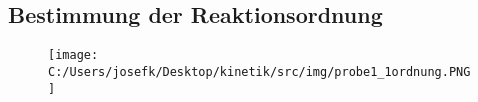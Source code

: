 \subsection{Bestimmung der Reaktionsordnung}

\begin{figure}[H]
	\texttt{[image: C:/Users/josefk/Desktop/kinetik/src/img/probe1\_1ordnung.PNG]}
\end{figure}
